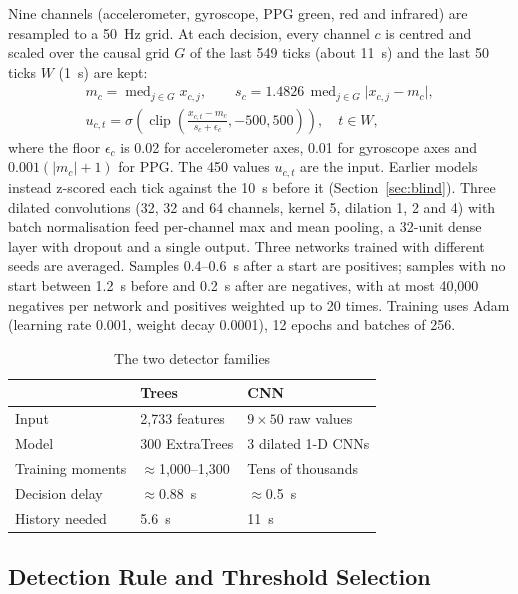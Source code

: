 Nine channels (accelerometer, gyroscope, PPG green, red and infrared) are resampled to a 50~Hz grid. At each decision, every channel $c$ is centred and scaled over the causal grid $G$ of the last 549 ticks (about 11~s) and the last 50 ticks $W$ (1~s) are kept:
\begin{gather}
  m_c = \operatorname{med}_{j\in G} x_{c,j}, \qquad s_c = 1.4826\,\operatorname{med}_{j\in G} \lvert x_{c,j} - m_c \rvert, \\
  u_{c,t} = \sigma\!\left(\operatorname{clip}\!\left(\frac{x_{c,t} - m_c}{s_c + \epsilon_c}, -500, 500\right)\right), \quad t \in W,
  \label{eq:norm}
\end{gather}
where the floor $\epsilon_c$ is 0.02 for accelerometer axes, 0.01 for gyroscope axes and $0.001(\lvert m_c\rvert + 1)$ for PPG. The 450 values $u_{c,t}$ are the input. Earlier models instead z-scored each tick against the 10~s before it (Section~\ref{sec:blind}). Three dilated convolutions (32, 32 and 64 channels, kernel 5, dilation 1, 2 and 4) with batch normalisation feed per-channel max and mean pooling, a 32-unit dense layer with dropout and a single output. Three networks trained with different seeds are averaged. Samples 0.4--0.6~s after a start are positives; samples with no start between 1.2~s before and 0.2~s after are negatives, with at most 40{,}000 negatives per network and positives weighted up to 20 times. Training uses Adam (learning rate 0.001, weight decay 0.0001), 12 epochs and batches of 256.

\begin{table}[t]
  \centering
  \caption{The two detector families}
  \label{tab:models}
  \small
  \begin{tabular}{@{}lll@{}}
    \toprule
     & Trees & CNN \\
    \midrule
    Input & 2{,}733 features & $9 \times 50$ raw values \\
    Model & 300 ExtraTrees & 3 dilated 1-D CNNs \\
    Training moments & $\approx$1{,}000--1{,}300 & Tens of thousands \\
    Decision delay & $\approx$0.88~s & $\approx$0.5~s \\
    History needed & 5.6~s & 11~s \\
    \bottomrule
  \end{tabular}
\end{table}

\subsection{Detection Rule and Threshold Selection}

